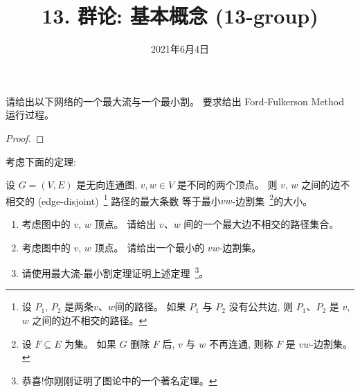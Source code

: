 \documentclass[a4paper, justified]{tufte-handout}
\title{13. 群论: 基本概念 (13-group)}
\date{2021年6月4日}
\begin{document}
\maketitle
\noplagiarism %
\begin{abstract}
\end{abstract}
\beginrequired

\begin{problem}
  请给出以下网络的一个最大流与一个最小割。
  要求给出 Ford-Fulkerson Method 运行过程。
\end{problem}

\begin{proof}
\end{proof}

\begin{problem}[\score{5 = 1 + 1 + 3} $\star\star\star\star$]
  考虑下面的定理:
  \begin{theorem}[不能告诉你名字的某个著名定理]
    设 $G = (V, E)$ 是无向连通图, $v, w \in V$ 是不同的两个顶点。
    则 $v$, $w$ 之间的边不相交的 (edge-disjoint)~\footnote{
      设 $P_{1}$, $P_{2}$ 是两条$v$、$w$间的路径。
      如果 $P_{1}$ 与 $P_{2}$ 没有公共边,
      则 $P_{1}$、$P_{2}$ 是 $v$, $w$ 之间的边不相交的路径。
    } 路径的最大条数
    等于最小$vw$-边割集~\footnote{
      设 $F \subseteq E$ 为集。
      如果 $G$ 删除 $F$ 后, $v$ 与 $w$ 不再连通,
      则称 $F$ 是 $vw$-边割集。
    }的大小。
  \end{theorem}


  \begin{enumerate}[(1)]
    \item 考虑图中的 $v$, $w$ 顶点。
      请给出 $v$、$w$ 间的一个最大边不相交的路径集合。
    \item 考虑图中的 $v$, $w$ 顶点。
      请给出一个最小的 $vw$-边割集。
    \item 请使用最大流-最小割定理证明上述定理~\footnote{恭喜!你刚刚证明了图论中的一个著名定理。}。
  \end{enumerate}
\end{problem}
\end{document}
